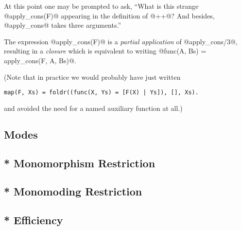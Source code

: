 At this point one may be prompted to ask, ``What is this strange
@apply_cons(F)@ appearing in the definition of @++@?  And besides,
@apply_cons@ takes three arguments.''

The expression @apply_cons(F)@ is a \emph{partial application} of
@apply_cons/3@, resulting in a \emph{closure} which is equivalent to
writing @func(A, Bs) = apply_cons(F, A, Bs)@.


(Note that in practice we would probably have just written
\begin{verbatim}
map(F, Xs) = foldr((func(X, Ys) = [F(X) | Ys]), [], Xs).
\end{verbatim}
and avoided the need for a named auxiliary function at all.)





\subsection{Modes}
\subsection{* Monomorphism Restriction}
\subsection{* Monomoding Restriction}
\subsection{* Efficiency}



